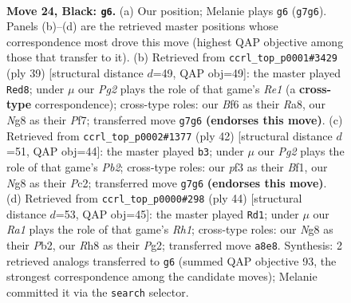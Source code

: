 \documentclass[11pt]{article}
\begin{document}
\clearpage

\begin{figure}[p]\centering
\begin{subfigure}{0.46\textwidth}\centering
\resizebox{\linewidth}{!}{%
\newchessgame
\chessboard[
  setfen={r4knr/p5pp/2p2b2/5B2/5B2/5P1P/PPP3P1/RR4K1 b - - 2 24},
  showmover=false,
  pgfstyle=straightmove, color=movearrow, markmove={g7-g6}
]}
\caption{}
\end{subfigure}\hfill
\begin{subfigure}{0.46\textwidth}\centering
\resizebox{\linewidth}{!}{%
\newchessgame
\chessboard[
  setfen={r3r1k1/1p3ppp/4b3/3n4/8/P3P3/1B1K1PPP/R4B1R b - - 0 20},
  showmover=false,
  pgfstyle=straightmove, color=movearrow, markmove={e8-d8}
]}
\caption{}
\end{subfigure}
\\[4pt]
\begin{subfigure}{0.46\textwidth}\centering
\resizebox{\linewidth}{!}{%
\newchessgame
\chessboard[
  setfen={2r3k1/p2rpp2/2p1b1p1/8/8/2R2P2/PPP3P1/2K2B1R w - - 2 22},
  showmover=false,
  pgfstyle=straightmove, color=movearrow, markmove={b2-b3}
]}
\caption{}
\end{subfigure}\hfill
\begin{subfigure}{0.46\textwidth}\centering
\resizebox{\linewidth}{!}{%
\newchessgame
\chessboard[
  setfen={6k1/p1rrpp2/B1p1b1p1/8/8/2R2P2/PPP3P1/2K4R w - - 4 23},
  showmover=false,
  pgfstyle=straightmove, color=movearrow, markmove={h1-d1}
]}
\caption{}
\end{subfigure}
\caption{\textbf{Move 24, Black: \texttt{g6}.} (a) Our position; Melanie plays \texttt{g6} (\texttt{g7g6}). Panels (b)--(d) are the retrieved master positions whose correspondence most drove this move (highest QAP objective among those that transfer to it). (b) Retrieved from \texttt{ccrl\_top\_p0001\#3429} (ply 39) [structural distance $d$=49, QAP obj=49]: the master played \texttt{Red8}; under $\mu$ our \emph{Pg2} plays the role of that game's \emph{Re1} (a \textbf{cross-type} correspondence); cross-type roles: our \emph{B}f6 as their \emph{R}a8, our \emph{N}g8 as their \emph{P}f7; transferred move \texttt{g7g6} \textbf{(endorses this move)}. (c) Retrieved from \texttt{ccrl\_top\_p0002\#1377} (ply 42) [structural distance $d$=51, QAP obj=44]: the master played \texttt{b3}; under $\mu$ our \emph{Pg2} plays the role of that game's \emph{Pb2}; cross-type roles: our \emph{p}f3 as their \emph{B}f1, our \emph{N}g8 as their \emph{P}c2; transferred move \texttt{g7g6} \textbf{(endorses this move)}. (d) Retrieved from \texttt{ccrl\_top\_p0000\#298} (ply 44) [structural distance $d$=53, QAP obj=45]: the master played \texttt{Rd1}; under $\mu$ our \emph{Ra1} plays the role of that game's \emph{Rh1}; cross-type roles: our \emph{N}g8 as their \emph{P}b2, our \emph{R}h8 as their \emph{P}g2; transferred move \texttt{a8e8}. Synthesis: 2 retrieved analogs transferred to \texttt{g6} (summed QAP objective 93, the strongest correspondence among the candidate moves); Melanie committed it via the \texttt{search} selector.}
\label{fig:thought-m47}
\end{figure}
\end{document}
